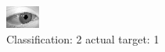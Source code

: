 \begin{figure}[h!]
\begin{center}
\includegraphics[width=0.60\columnwidth]{figures/ID2738_class_2_target_1.png}
\end{center}
\caption{ Classification: 2 actual target: 1}
\label{fig:ID2738_class_2_target_1}
\end{figure}
